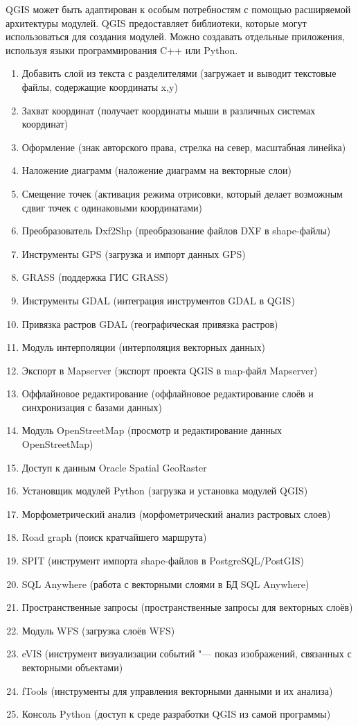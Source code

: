 
QGIS может быть адаптирован к особым потребностям с помощью расширяемой
архитектуры модулей. QGIS предоставляет библиотеки, которые могут
использоваться для создания модулей. Можно создавать отдельные
приложения, используя языки программирования C++ или Python.


\begin{enumerate}
\item Добавить слой из текста с разделителями (загружает и выводит
текстовые файлы, содержащие координаты x,y)
\item Захват координат (получает координаты мыши в различных системах
координат)
\item Оформление (знак авторского права, стрелка на север, масштабная
линейка)
\item Наложение диаграмм (наложение диаграмм на векторные слои)
\item Смещение точек (активация режима отрисовки, который делает возможным
сдвиг точек с одинаковыми координатами)
\item Преобразователь Dxf2Shp (преобразование файлов DXF в shape-файлы)
\item Инструменты GPS (загрузка и импорт данных GPS)
\item GRASS (поддержка ГИС GRASS)
\item Инструменты GDAL (интеграция инструментов GDAL в QGIS)
\item Привязка растров GDAL (географическая привязка растров)
\item Модуль интерполяции (интерполяция векторных данных)
\item Экспорт в Mapserver (экспорт проекта QGIS в map-файл Mapserver)
\item Оффлайновое редактирование (оффлайновое редактирование слоёв и
синхронизация с базами данных)
\item Модуль OpenStreetMap (просмотр и редактирование данных
OpenStreetMap)
\item Доступ к данным Oracle Spatial GeoRaster
\item Установщик модулей Python (загрузка и установка модулей QGIS)
\item Морфометрический анализ (морфометрический анализ растровых слоев)
\item Road graph (поиск кратчайшего маршрута)
\item SPIT (инструмент импорта shape-файлов в PostgreSQL/PostGIS)
\item SQL Anywhere (работа с векторными слоями в БД SQL Anywhere)
\item Пространственные запросы (пространственные запросы для векторных слоёв)
\item Модуль WFS (загрузка слоёв WFS)
\item eVIS (инструмент визуализации событий "--- показ изображений, связанных
с векторными объектами)
\item fTools (инструменты для управления векторными данными и их анализа)
\item Консоль Python (доступ к среде разработки QGIS из самой программы)


\end{enumerate}
